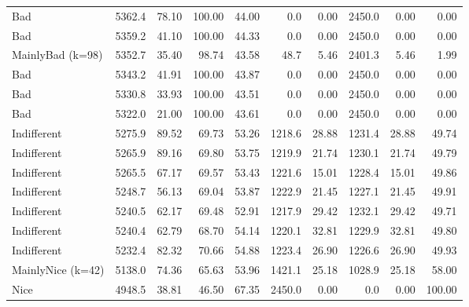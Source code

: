 \documentclass[journal,a4paper,10pt,twoside]{IEEEtran} %
\begin{document}
\begin{table}[ht]
\begin{tabular}{l|rrrr|rrrrr}
		Bad               & 5362.4 &  78.10 & 100.00 &   44.00 &    0.0 &                   0.00 & 2450.0 &                    0.00 &     0.00 \\
		Bad               & 5359.2 &  41.10 & 100.00 &   44.33 &    0.0 &                   0.00 & 2450.0 &                    0.00 &     0.00 \\
		MainlyBad (k=98)  & 5352.7 &  35.40 &  98.74 &   43.58 &   48.7 &                   5.46 & 2401.3 &                    5.46 &     1.99 \\
		Bad               & 5343.2 &  41.91 & 100.00 &   43.87 &    0.0 &                   0.00 & 2450.0 &                    0.00 &     0.00 \\
		Bad               & 5330.8 &  33.93 & 100.00 &   43.51 &    0.0 &                   0.00 & 2450.0 &                    0.00 &     0.00 \\
		Bad               & 5322.0 &  21.00 & 100.00 &   43.61 &    0.0 &                   0.00 & 2450.0 &                    0.00 &     0.00 \\
		Indifferent       & 5275.9 &  89.52 &  69.73 &   53.26 & 1218.6 &                  28.88 & 1231.4 &                   28.88 &    49.74 \\
		Indifferent       & 5265.9 &  89.16 &  69.80 &   53.75 & 1219.9 &                  21.74 & 1230.1 &                   21.74 &    49.79 \\
		Indifferent       & 5265.5 &  67.17 &  69.57 &   53.43 & 1221.6 &                  15.01 & 1228.4 &                   15.01 &    49.86 \\
		Indifferent       & 5248.7 &  56.13 &  69.04 &   53.87 & 1222.9 &                  21.45 & 1227.1 &                   21.45 &    49.91 \\
		Indifferent       & 5240.5 &  62.17 &  69.48 &   52.91 & 1217.9 &                  29.42 & 1232.1 &                   29.42 &    49.71 \\
		Indifferent       & 5240.4 &  62.79 &  68.70 &   54.14 & 1220.1 &                  32.81 & 1229.9 &                   32.81 &    49.80 \\
		Indifferent       & 5232.4 &  82.32 &  70.66 &   54.88 & 1223.4 &                  26.90 & 1226.6 &                   26.90 &    49.93 \\
		MainlyNice (k=42) & 5138.0 &  74.36 &  65.63 &   53.96 & 1421.1 &                  25.18 & 1028.9 &                   25.18 &    58.00 \\
		Nice              & 4948.5 &  38.81 &  46.50 &   67.35 & 2450.0 &                   0.00 &    0.0 &                    0.00 &   100.00 \\

\end{tabular}
\end{table}
\end{document}
